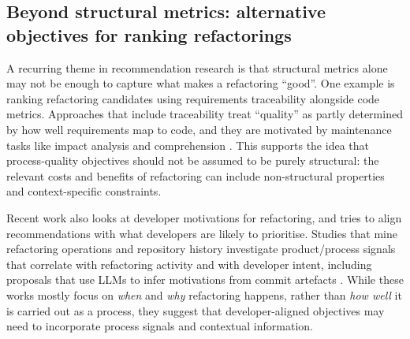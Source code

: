 \subsection{Beyond structural metrics: alternative objectives for ranking refactorings}
A recurring theme in recommendation research is that structural metrics alone may not be enough to capture what makes a refactoring ``good''. One example is ranking refactoring candidates using requirements traceability alongside code metrics. Approaches that include traceability treat ``quality'' as partly determined by how well requirements map to code, and they are motivated by maintenance tasks like impact analysis and comprehension \cite{wang2018traceability}. This supports the idea that process-quality objectives should not be assumed to be purely structural: the relevant costs and benefits of refactoring can include non-structural properties and context-specific constraints.

Recent work also looks at developer motivations for refactoring, and tries to align recommendations with what developers are likely to prioritise. Studies that mine refactoring operations and repository history investigate product/process signals that correlate with refactoring activity and with developer intent, including proposals that use LLMs to infer motivations from commit artefacts \cite{whydevelopersrefactor2020,metricsmotivation2024}. While these works mostly focus on \emph{when} and \emph{why} refactoring happens, rather than \emph{how well} it is carried out as a process, they suggest that developer-aligned objectives may need to incorporate process signals and contextual information.

